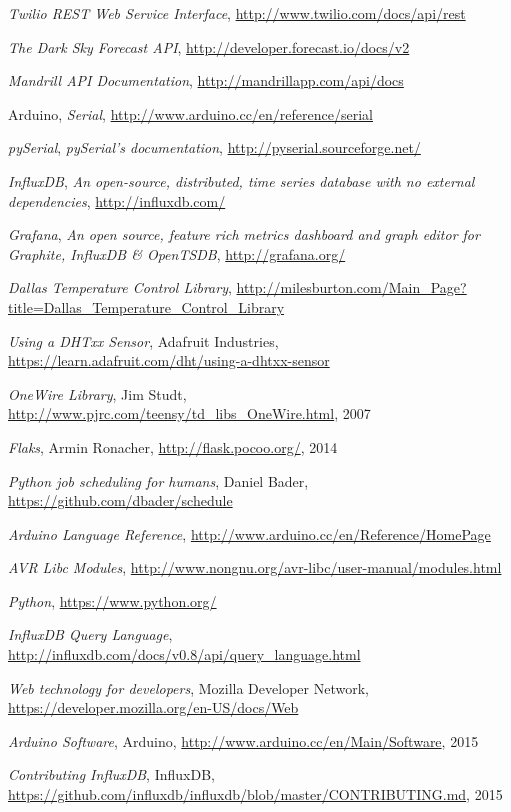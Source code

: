 \documentclass[12pt]{report}
\begin{document}
\renewcommand\bibname{References}
\begin{thebibliography}{}

  \emph{Twilio REST Web Service Interface},
  \url{http://www.twilio.com/docs/api/rest}
  
  \emph{The Dark Sky Forecast API},
  \url{http://developer.forecast.io/docs/v2}
  
  \emph{Mandrill API Documentation},
  \url{http://mandrillapp.com/api/docs}
  
  Arduino, \emph{Serial},
  \url{http://www.arduino.cc/en/reference/serial}
  
  \textit{pySerial}, \emph{pySerial’s documentation},
  \url{http://pyserial.sourceforge.net/}
  
  \textit{InfluxDB}, \emph{An open-source, distributed, time series database
with no external dependencies},
  \url{http://influxdb.com/}
  
  \textit{Grafana}, \emph{An open source, feature rich metrics dashboard and graph editor for
Graphite, InfluxDB \& OpenTSDB},
  \url{http://grafana.org/}
  
  \textit{Dallas Temperature Control Library},
  \url{http://milesburton.com/Main_Page?title=Dallas_Temperature_Control_Library}
  
  \textit{Using a DHTxx Sensor}, Adafruit Industries,
  \url{https://learn.adafruit.com/dht/using-a-dhtxx-sensor}
  
  \textit{OneWire Library}, Jim Studt,
  \url{http://www.pjrc.com/teensy/td_libs_OneWire.html}, 2007
  
  \textit{Flaks}, Armin Ronacher,
  \url{http://flask.pocoo.org/}, 2014

  \textit{Python job scheduling for humans}, Daniel Bader,
  \url{https://github.com/dbader/schedule}
  
  \textit{Arduino Language Reference},
  \url{http://www.arduino.cc/en/Reference/HomePage}
  
  \textit{AVR Libc Modules},
  \url{http://www.nongnu.org/avr-libc/user-manual/modules.html}
  
  \textit{Python},
  \url{https://www.python.org/}
  
  \textit{InfluxDB Query Language},
  \url{http://influxdb.com/docs/v0.8/api/query_language.html}
  
  \textit{Web technology for developers}, Mozilla Developer Network,
  \url{https://developer.mozilla.org/en-US/docs/Web}
  
  \textit{Arduino Software}, Arduino,
  \url{http://www.arduino.cc/en/Main/Software}, 2015
 
  \textit{Contributing InfluxDB}, InfluxDB,
  \url{https://github.com/influxdb/influxdb/blob/master/CONTRIBUTING.md}, 2015
\end{thebibliography}
\end{document}
